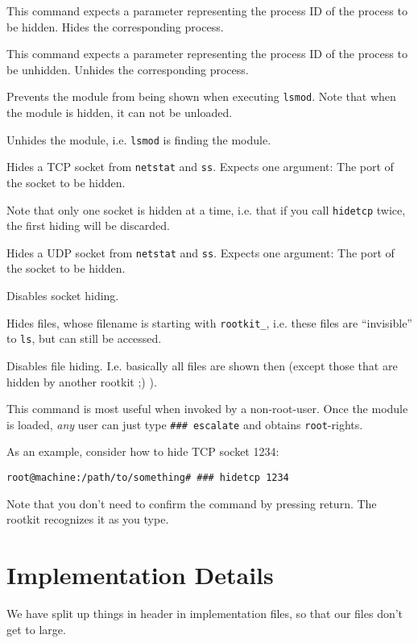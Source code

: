 \documentclass[10pt, letterpaper]{article}
\begin{document}
\begin{description}[font=\ttfamily]
\item[hideproc] This command expects a parameter representing the process ID of the process to be hidden. Hides the corresponding process.
\item[unhideproc] This command expects a parameter representing the process ID of the process to be unhidden. Unhides the corresponding process.
\item[hidemodule] Prevents the module from being shown when executing \texttt{lsmod}. Note that when the module is hidden, it can not be unloaded.
\item[unhidemodule] Unhides the module, i.e. \texttt{lsmod} is finding the module.
\item[hidetcp] Hides a TCP socket from \texttt{netstat} and \texttt{ss}. Expects one argument: The port of the socket to be hidden. 

Note that only one socket is hidden at a time, i.e. that if you call \texttt{hidetcp} twice, the first hiding will be discarded.
\item[hideudp] Hides a UDP socket from \texttt{netstat} and \texttt{ss}. Expects one argument: The port of the socket to be hidden.
\item[unhidesocket] Disables socket hiding.
\item[hidefiles] Hides files, whose filename is starting with \texttt{rootkit\_}, i.e. these files are ``invisible'' to \texttt{ls}, but can still be accessed.
\item[unhidefiles] Disables file hiding. I.e. basically all files are shown then (except those that are hidden by another rootkit ;) ).
\item[escalate] This command is most useful when invoked by a non-root-user. Once the module is loaded, \emph{any} user can just type \texttt{\#\#\# escalate} and obtains \texttt{root}-rights.
\end{description}

As an example, consider how to hide TCP socket 1234:

\begin{verbatim}
root@machine:/path/to/something# ### hidetcp 1234
\end{verbatim}

Note that you don't need to confirm the command by pressing return. The rootkit recognizes it as you type.

\section{Implementation Details}
We have split up things in header in implementation files, so
that our files don't get to large.
\end{document}
